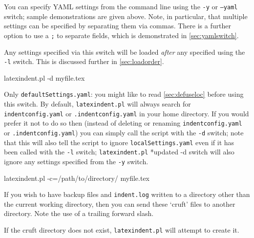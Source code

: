  \label{page:yamlswitch}You%
  can specify YAML settings from the command line
 using the \texttt{-y} or \texttt{--yaml} switch; sample demonstrations are given above.
 Note, in particular, that multiple settings can be specified by separating them via
 commas. There is a further option to use a \texttt{;} to separate fields, which is
 demonstrated in \vref{sec:yamlswitch}.

 Any settings specified via this switch will be loaded \emph{after} any specified using
 the \texttt{-l} switch. This is discussed further in \vref{sec:loadorder}.  

 \begin{commandshell}
latexindent.pl -d myfile.tex
\end{commandshell}

 Only \texttt{defaultSettings.yaml}: you might like to read \cref{sec:defuseloc} before
 using this switch. By default, \texttt{latexindent.pl} will always search for
 \texttt{indentconfig.yaml} or \texttt{.indentconfig.yaml} in your home directory. If you
 would prefer it not to do so then (instead of deleting or renaming
 \texttt{indentconfig.yaml} or \texttt{.indentconfig.yaml}) you can simply call the
 script with the \texttt{-d} switch; note that this will also tell the script to ignore
 \texttt{localSettings.yaml} even if it has been called with the \texttt{-l} switch;
 \texttt{latexindent.pl} *{updated -d switch} will also ignore any
 settings specified from the \texttt{-y} switch.%


 \begin{commandshell}
latexindent.pl -c=/path/to/directory/ myfile.tex
\end{commandshell}

 If you wish to have backup files and \texttt{indent.log} written to a directory other
 than the current working directory, then you can send these `cruft' files to another
 directory. Note the use of a trailing forward slash. %

 If the cruft directory does not exist, \texttt{latexindent.pl} will attempt to create
 it.


